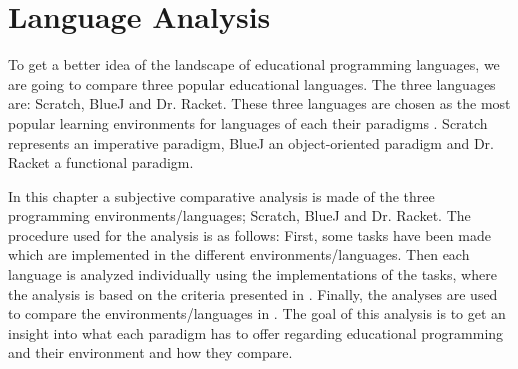 \chapter{Language Analysis}
\label{chap:language_analysis}
To get a better idea of the landscape of educational programming languages, we are going to compare three popular educational languages.
The three languages are: Scratch, BlueJ and Dr. Racket.
These three languages are chosen as the most popular learning environments for languages of each their paradigms .
Scratch represents an imperative paradigm, BlueJ an object-oriented paradigm and Dr. Racket a functional paradigm.

In this chapter a subjective comparative analysis is made of the three programming environments/languages; Scratch, BlueJ and Dr. Racket. The procedure used for the analysis is as follows: First, some tasks have been made which are implemented in the different environments/languages. Then each language is analyzed individually using the implementations of the tasks, where the analysis is based on the criteria presented in . Finally, the analyses are used to compare the environments/languages in .  The goal of this analysis is to get an insight into what each paradigm has to offer regarding educational programming and their environment and how they compare. 

